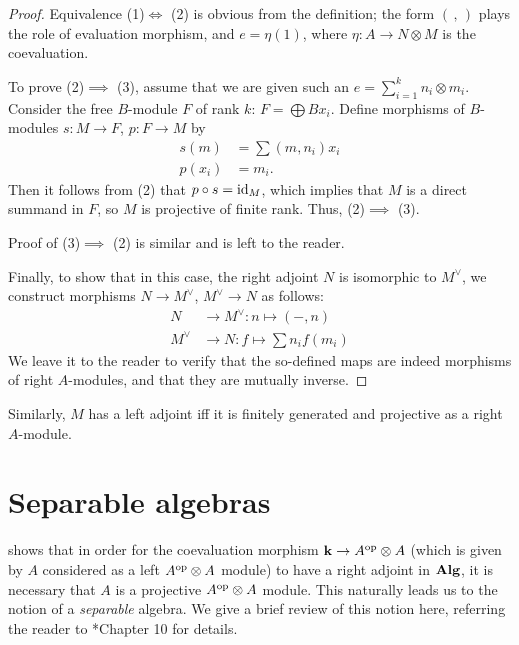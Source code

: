 \begin{proof}
  Equivalence (1)$\iff$ (2) is obvious from the definition; the form
  $(\, , \,)$ plays the role of evaluation morphism, and $e=\eta (1)$,
  where $\eta\colon A\to N\otimes M$ is the coevaluation.

  To prove (2)$\implies$ (3), assume that we are given such an
  $e=\sum_{i=1}^k n_i\otimes m_i$. Consider the free
  $B$-module $F$ of rank $k$: $F=\bigoplus B x_i$. Define morphisms
  of $B$-modules $s\colon M\to F$, $p\colon F\to M$ by
  \begin{align*}
  s(m)&=\sum (m, n_i)x_i\\
  p(x_i)&=m_i.
  \end{align*}
  Then it follows from (2) that $p\circ s =\operatorname{id}_{M}$, which implies that
  $M$ is a direct summand in $F$, so $M$ is projective of finite rank.
  Thus, (2)$\implies$ (3).

  Proof of (3)$\implies$ (2) is similar and is left to the reader.

  Finally, to show that in this case, the right adjoint $N$ is isomorphic
  to $M^\vee$, we construct morphisms $N\to M^\vee$, $M^\vee\to N$ as follows:
  \begin{align*}
    N&\to M^\vee\colon n\mapsto (-, n)\\
    M^\vee&\to N\colon f\mapsto \sum n_i f(m_i)
  \end{align*}
  We leave it to the reader to verify that the so-defined maps are indeed morphisms
  of right $A$-modules, and that they are mutually inverse.
\end{proof}

Similarly, $M$ has a left adjoint iff it is finitely generated and projective
as a right $A$-module.

\section{Separable algebras}\label{s:separable}

 shows that in order for the coevaluation morphism $\mathbf{k}
\to A^{\mathrm{op}}\otimes A$ (which is given by $A$ considered as a left $A^{\mathrm{op}} \otimes
A$ module) to have a right adjoint in $\mathbf{Alg}$, it is necessary that $A$ is a
projective $A^{\mathrm{op}}\otimes A$ module. This naturally leads us to the notion of a
\emph{separable} algebra. We give a brief review of this notion here, referring
the reader to *{Chapter 10} for details.


